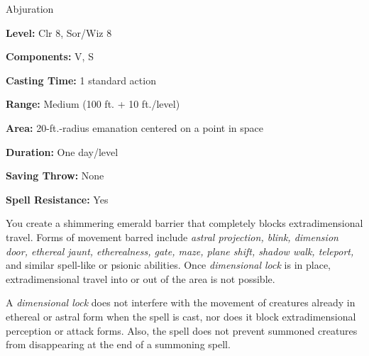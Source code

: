 
Abjuration

\textbf{Level:} Clr 8, Sor/Wiz 8

\textbf{Components:} V, S

\textbf{Casting Time:} 1 standard action

\textbf{Range:} Medium (100 ft. + 10 ft./level)

\textbf{Area:} 20-ft.-radius emanation centered on a point in space

\textbf{Duration:} One day/level

\textbf{Saving Throw:} None

\textbf{Spell Resistance:} Yes

You create a shimmering emerald barrier that completely blocks extradimensional 
travel. Forms of movement barred include \textit{astral projection, blink, dimension 
door, ethereal jaunt, etherealness, gate, maze, plane shift, shadow walk, teleport, 
}and similar spell-like or psionic abilities. Once \textit{dimensional lock} is 
in place, extradimensional travel into or out of the area is not possible.

A \textit{dimensional lock} does not interfere with the movement of creatures already 
in ethereal or astral form when the spell is cast, nor does it block extradimensional 
perception or attack forms. Also, the spell does not prevent summoned creatures 
from disappearing at the end of a summoning spell.


